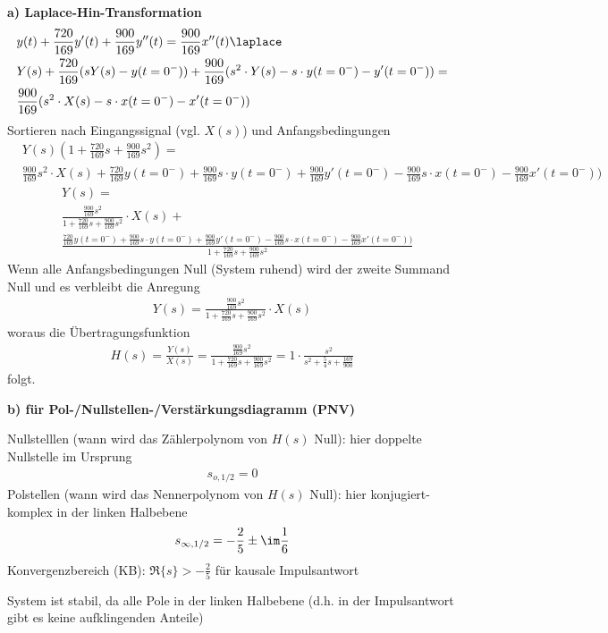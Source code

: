 \begin{ExCalc}
\textbf{a) Laplace-Hin-Transformation}
\begin{align}
&y(t) + \frac{720}{169} y'(t) + \frac{900}{169} y''(t) = \frac{900}{169} x''(t) \laplace\\
&Y(s) + \frac{720}{169} (s Y(s) - y(t=0^-)) + \frac{900}{169} (s^2 \cdot Y(s) - s \cdot y(t=0^-) - y'(t=0^-)) =\nonumber\\
&\frac{900}{169} (s^2 \cdot X(s) - s \cdot x(t=0^-) - x'(t=0^-))
\end{align}
Sortieren nach Eingangssignal (vgl. $X(s)$) und Anfangsbedingungen
\begin{align}
&Y(s) (1 + \frac{720}{169} s + \frac{900}{169} s^2) = \nonumber\\
&\frac{900}{169} s^2 \cdot X(s) + \frac{720}{169} y(t=0^-) + \frac{900}{169} s \cdot y(t=0^-) + \frac{900}{169} y'(t=0^-) - \frac{900}{169} s \cdot x(t=0^-) - \frac{900}{169} x'(t=0^-))
\end{align}
%
\begin{align}
&Y(s) = \nonumber\\
&\frac{\frac{900}{169} s^2}{1 + \frac{720}{169} s + \frac{900}{169} s^2}
\cdot X(s) +\nonumber\\
&\frac{\frac{720}{169} y(t=0^-) + \frac{900}{169} s \cdot y(t=0^-) + \frac{900}{169} y'(t=0^-) - \frac{900}{169} s \cdot x(t=0^-) - \frac{900}{169} x'(t=0^-))}{1 + \frac{720}{169} s + \frac{900}{169} s^2}
\end{align}
Wenn alle Anfangsbedingungen Null (System ruhend) wird der zweite Summand Null und es verbleibt die Anregung
\begin{align}
Y(s) = \frac{\frac{900}{169} s^2}{1 + \frac{720}{169} s + \frac{900}{169} s^2} \cdot X(s)
\end{align}
woraus die Übertragungsfunktion
\begin{align}
H(s) = \frac{Y(s)}{X(s)} = \frac{\frac{900}{169} s^2}{1 + \frac{720}{169} s + \frac{900}{169} s^2}
= 1 \cdot \frac{s^2}{s^2 + \frac{5}{4} s + \frac{169}{900}}
\end{align}
folgt.

\noindent \textbf{b) für Pol-/Nullstellen-/Verstärkungsdiagramm (PNV)}

Nullstelllen (wann wird das Zählerpolynom von $H(s)$ Null): hier doppelte Nullstelle im Ursprung
\begin{align}
s_{o,1/2} = 0
\end{align}
Polstellen (wann wird das Nennerpolynom von $H(s)$ Null): hier konjugiert-komplex in der linken Halbebene
\begin{align}
s_{\infty,1/2} = -\frac{2}{5} \pm \im \frac{1}{6}
\end{align}
Konvergenzbereich (KB): $\Re\{s\}>-\frac{2}{5}$ für kausale Impulsantwort

System ist stabil, da alle Pole in der linken Halbebene (d.h. in der Impulsantwort gibt es keine aufklingenden Anteile)

\end{ExCalc}

